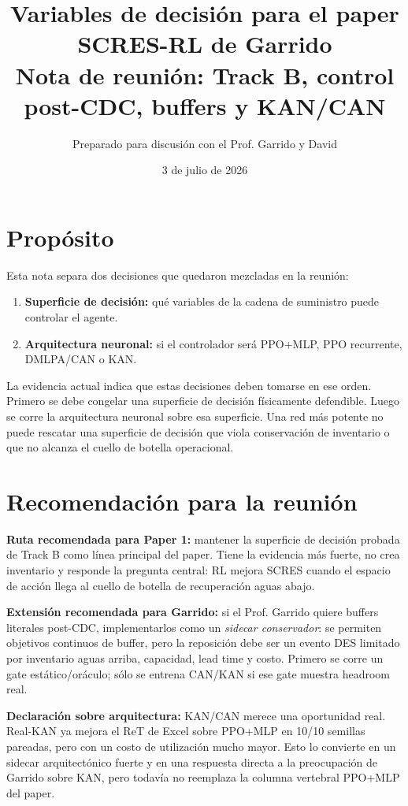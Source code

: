 \documentclass[11pt]{article}
\title{\textbf{Variables de decisión para el paper SCRES-RL de Garrido}\\
\large Nota de reunión: Track B, control post-CDC, buffers y KAN/CAN}
\author{Preparado para discusión con el Prof. Garrido y David}
\date{3 de julio de 2026}
\begin{document}
\maketitle

\section*{Propósito}

Esta nota separa dos decisiones que quedaron mezcladas en la reunión:

\begin{enumerate}[leftmargin=1.5em]
  \item \textbf{Superficie de decisión:} qué variables de la cadena de suministro puede controlar el agente.
  \item \textbf{Arquitectura neuronal:} si el controlador será PPO+MLP, PPO recurrente, DMLPA/CAN o KAN.
\end{enumerate}

La evidencia actual indica que estas decisiones deben tomarse en ese orden.
Primero se debe congelar una superficie de decisión físicamente defendible.
Luego se corre la arquitectura neuronal sobre esa superficie. Una red más
potente no puede rescatar una superficie de decisión que viola conservación de
inventario o que no alcanza el cuello de botella operacional.

\section*{Recomendación para la reunión}

\textbf{Ruta recomendada para Paper 1:} mantener la superficie de decisión
probada de Track B como línea principal del paper. Tiene la evidencia más
fuerte, no crea inventario y responde la pregunta central: RL mejora SCRES
cuando el espacio de acción llega al cuello de botella de recuperación aguas
abajo.

\textbf{Extensión recomendada para Garrido:} si el Prof. Garrido quiere buffers
literales post-CDC, implementarlos como un \emph{sidecar conservador}: se
permiten objetivos continuos de buffer, pero la reposición debe ser un evento
DES limitado por inventario aguas arriba, capacidad, lead time y costo. Primero
se corre un gate estático/oráculo; sólo se entrena CAN/KAN si ese gate muestra
headroom real.

\textbf{Declaración sobre arquitectura:} KAN/CAN merece una oportunidad real.
Real-KAN ya mejora el ReT de Excel sobre PPO+MLP en 10/10 semillas pareadas,
pero con un costo de utilización mucho mayor. Esto lo convierte en un sidecar
arquitectónico fuerte y en una respuesta directa a la preocupación de Garrido
sobre KAN, pero todavía no reemplaza la columna vertebral PPO+MLP del paper.
\end{document}
